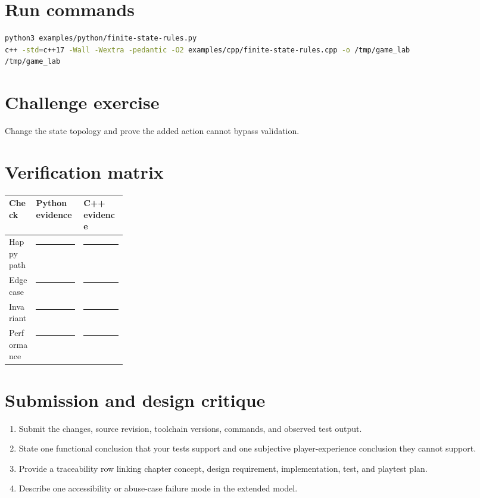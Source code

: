 \documentclass[11pt]{article}
\begin{document}
\section{Run commands}
\begin{lstlisting}[language=bash]
python3 examples/python/finite-state-rules.py
c++ -std=c++17 -Wall -Wextra -pedantic -O2 examples/cpp/finite-state-rules.cpp -o /tmp/game_lab
/tmp/game_lab
\end{lstlisting}

\section{Challenge exercise}
Change the state topology and prove the added action cannot bypass validation.


\section{Verification matrix}
\begin{tabularx}{\linewidth}{@{}p{0.23\linewidth}X X@{}}\toprule Check & Python evidence & C++ evidence\\\midrule
Happy path & \rule{0.85\linewidth}{0.4pt} & \rule{0.85\linewidth}{0.4pt}\\[0.35cm]
Edge case & \rule{0.85\linewidth}{0.4pt} & \rule{0.85\linewidth}{0.4pt}\\[0.35cm]
Invariant & \rule{0.85\linewidth}{0.4pt} & \rule{0.85\linewidth}{0.4pt}\\[0.35cm]
Performance & \rule{0.85\linewidth}{0.4pt} & \rule{0.85\linewidth}{0.4pt}\\\bottomrule\end{tabularx}

\section{Submission and design critique}
\begin{enumerate}
\item Submit the changes, source revision, toolchain versions, commands, and observed test output.
\item State one functional conclusion that your tests support and one subjective player-experience conclusion they cannot support.
\item Provide a traceability row linking chapter concept, design requirement, implementation, test, and playtest plan.
\item Describe one accessibility or abuse-case failure mode in the extended model.
\end{enumerate}
\end{document}
